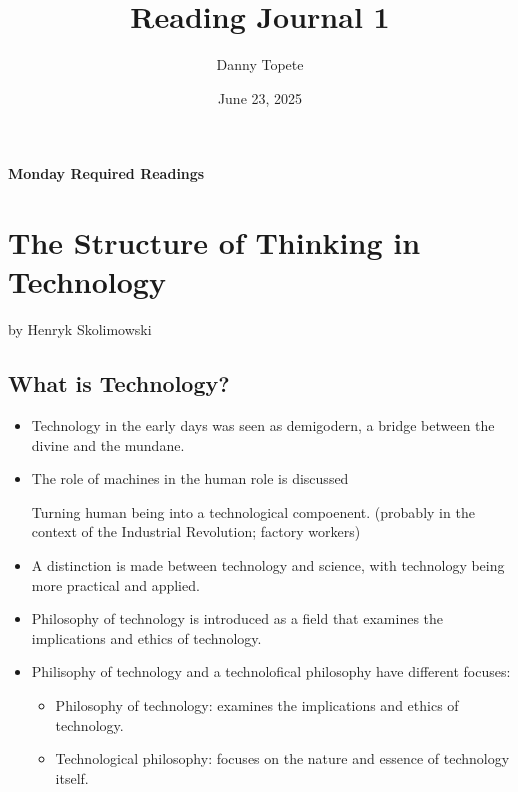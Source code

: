 \documentclass{article}
\title{Reading Journal 1}
\author{Danny Topete}
\date{June 23, 2025}
\begin{document}
\maketitle

\noindent \textbf{Monday Required Readings}

\section{The Structure of Thinking in Technology}
by Henryk Skolimowski

\subsection{What is Technology?}
\begin{itemize}
  \item Technology in the early days was seen as demigodern, a bridge between the divine and the mundane.
  \item The role of machines in the human role is discussed

    Turning human being into a technological compoenent. (probably in the context of the Industrial Revolution; factory workers)
  \item A distinction is made between technology and science, with technology being more practical and applied.
  \item Philosophy of technology is introduced as a field that examines the implications and ethics of technology.
  \item Philisophy of technology and a technolofical philosophy have different focuses:
    \begin{itemize}
      \item Philosophy of technology: examines the implications and ethics of technology.
      \item Technological philosophy: focuses on the nature and essence of technology itself.
    \end{itemize}
\end{itemize}
\end{document}
